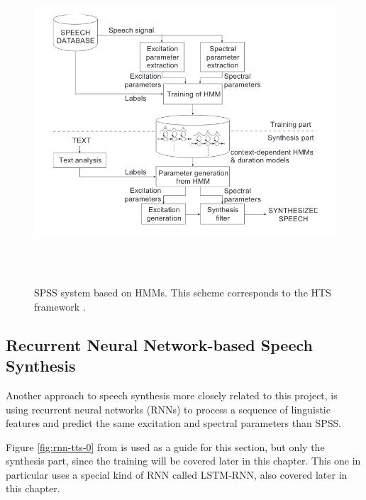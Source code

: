 \begin{figure}
    \centering
    \includegraphics[height=12cm]{figures/hts}
    \caption{SPSS system based on HMMs. This scheme corresponds to the HTS framework \cite{zen2007hmm}.}
    \label{fig:hts}
\end{figure}



\subsection{Recurrent Neural Network-based Speech Synthesis} \label{sec:rnn-tts}

Another approach to speech synthesis more closely related to this project, is using recurrent neural networks (RNNs) to process a sequence of linguistic features and predict the same excitation and spectral parameters than SPSS.

Figure \ref{fig:rnn-tts-0} from \cite{chen1998rnn} is used as a guide for this section, but only the synthesis part, since the training will be covered later in this chapter. This one in particular uses a special kind of RNN called LSTM-RNN, also covered later in this chapter.

